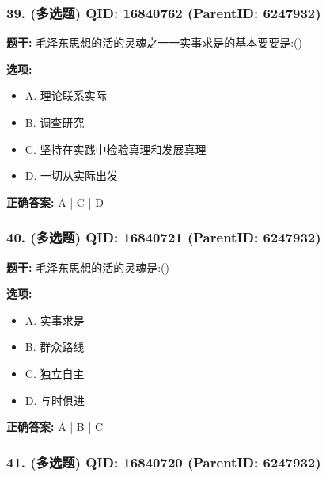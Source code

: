 \documentclass[12pt,UTF8]{ctexart}
\begin{document}
\subsubsection*{39. (多选题) \small QID: 16840762 (ParentID: 6247932)}

\textbf{题干:}
毛泽东思想的活的灵魂之一一实事求是的基本要要是:()



\textbf{选项:}
\begin{itemize}[leftmargin=*]

  \item A. 理论联系实际

  \item B. 调查研究

  \item C. 坚持在实践中检验真理和发展真理

  \item D. 一切从实际出发

\end{itemize}

\textbf{正确答案:}
A | C | D

\vspace{0.3em}\hrulefill\vspace{0.7em}

\subsubsection*{40. (多选题) \small QID: 16840721 (ParentID: 6247932)}

\textbf{题干:}
毛泽东思想的活的灵魂是:()



\textbf{选项:}
\begin{itemize}[leftmargin=*]

  \item A. 实事求是

  \item B. 群众路线

  \item C. 独立自主

  \item D. 与时俱进

\end{itemize}

\textbf{正确答案:}
A | B | C

\vspace{0.3em}\hrulefill\vspace{0.7em}

\subsubsection*{41. (多选题) \small QID: 16840720 (ParentID: 6247932)}
\end{document}
